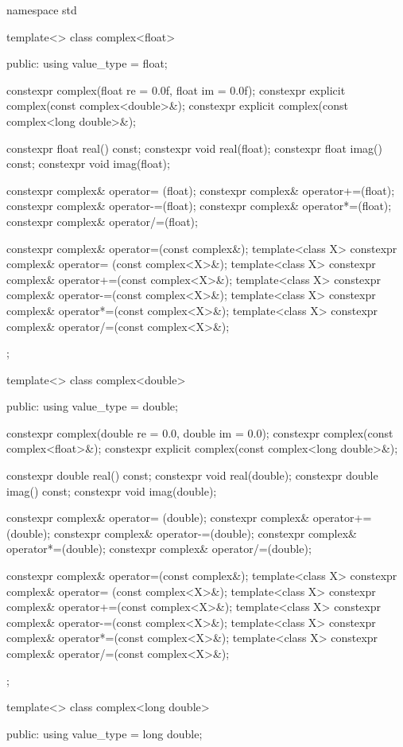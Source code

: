 \begin{codeblock}
namespace std {
  template<> class complex<float> {
  public:
    using value_type = float;

    constexpr complex(float re = 0.0f, float im = 0.0f);
    constexpr explicit complex(const complex<double>&);
    constexpr explicit complex(const complex<long double>&);

    constexpr float real() const;
    constexpr void real(float);
    constexpr float imag() const;
    constexpr void imag(float);

    constexpr complex& operator= (float);
    constexpr complex& operator+=(float);
    constexpr complex& operator-=(float);
    constexpr complex& operator*=(float);
    constexpr complex& operator/=(float);

    constexpr complex& operator=(const complex&);
    template<class X> constexpr complex& operator= (const complex<X>&);
    template<class X> constexpr complex& operator+=(const complex<X>&);
    template<class X> constexpr complex& operator-=(const complex<X>&);
    template<class X> constexpr complex& operator*=(const complex<X>&);
    template<class X> constexpr complex& operator/=(const complex<X>&);
  };

  template<> class complex<double> {
  public:
    using value_type = double;

    constexpr complex(double re = 0.0, double im = 0.0);
    constexpr complex(const complex<float>&);
    constexpr explicit complex(const complex<long double>&);

    constexpr double real() const;
    constexpr void real(double);
    constexpr double imag() const;
    constexpr void imag(double);

    constexpr complex& operator= (double);
    constexpr complex& operator+=(double);
    constexpr complex& operator-=(double);
    constexpr complex& operator*=(double);
    constexpr complex& operator/=(double);

    constexpr complex& operator=(const complex&);
    template<class X> constexpr complex& operator= (const complex<X>&);
    template<class X> constexpr complex& operator+=(const complex<X>&);
    template<class X> constexpr complex& operator-=(const complex<X>&);
    template<class X> constexpr complex& operator*=(const complex<X>&);
    template<class X> constexpr complex& operator/=(const complex<X>&);
  };

  template<> class complex<long double> {
  public:
    using value_type = long double;

}}
\end{codeblock}
